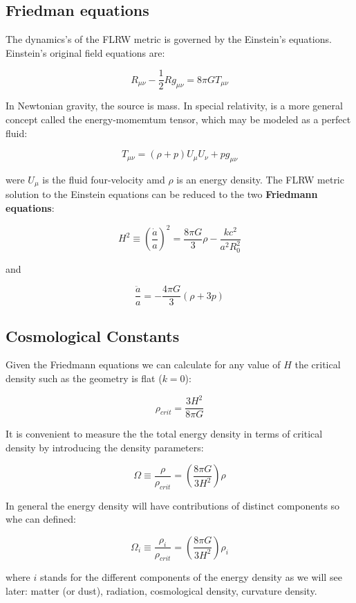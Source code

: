 \documentclass[
  letterpaper,
  DIV=11,
  numbers=noendperiod]{scrreprt}
\begin{document}
\subsection*{Friedman equations}\label{friedman-equations}

The dynamics's of the FLRW metric is governed by the Einstein's
equations. Einstein's original field equations are:

\[R_{\mu\nu} - \frac{1}{2}Rg_{\mu\nu} = 8 \pi GT_{\mu\nu}\]

In Newtonian gravity, the source is mass. In special relativity, is a
more general concept called the energy-momemtum tensor, which may be
modeled as a perfect fluid:

\[T_{\mu\nu} = (\rho + p)U_\mu U_\nu + pg_{\mu\nu}\]

were \(U_\mu\) is the fluid four-velocity amd \(\rho\) is an energy
density. The FLRW metric solution to the Einstein equations can be
reduced to the two \textbf{Friedmann equations}:

\[H^2 \equiv \left(\frac{\dot a}{a}\right)^{2} =  \frac{8\pi G}{3}\rho - \frac{kc^{2}}{a^2R^2_0} \]

and

\[\frac{\ddot a}{a} = -\frac{4\pi G}{3}(\rho + 3p)\]

\subsection*{Cosmological Constants}\label{cosmological-constants}

Given the Friedmann equations we can calculate for any value of \(H\)
the critical density such as the geometry is flat (\(k=0\)):

\[\rho_{crit} = \frac{3H^2}{8\pi G}\]

It is convenient to measure the the total energy density in terms of
critical density by introducing the density parameters:

\[\Omega\equiv\frac{\rho}{\rho_{crit}} = \left(\frac{8\pi G}{3H^2}\right)\rho\]

In general the energy density will have contributions of distinct
components so whe can defined:

\[\Omega_i\equiv\frac{\rho_i}{\rho_{crit}} = \left(\frac{8\pi G}{3H^2}\right)\rho_i\]

where \(i\) stands for the different components of the energy density as
we will see later: matter (or dust), radiation, cosmological density,
curvature density.
\end{document}
